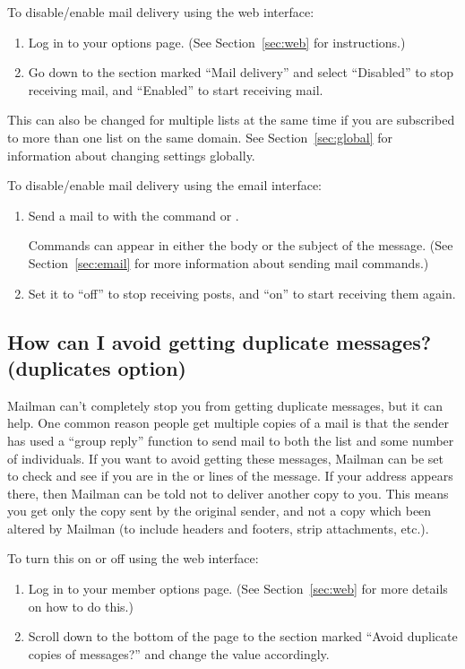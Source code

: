 \documentclass{howto}
\begin{document}
To disable/enable mail delivery using the web interface:
\begin{enumerate}
	\item Log in to your options page. (See Section~\ref{sec:web} for instructions.)
	\item Go down to the section marked ``Mail delivery'' and select ``Disabled''
		to stop receiving mail, and ``Enabled'' to start receiving mail.
\end{enumerate}

This can also be changed for multiple lists at the same time if you are subscribed to 
more than one list on the same domain.  See Section~\ref{sec:global} for 
information about changing settings globally.

To disable/enable mail delivery using the email interface:
\begin{enumerate}
   \item Send a mail to  with the command
    or .

   Commands can appear
   in either the body or the subject of the message.  (See
   Section~\ref{sec:email} for more information about sending mail
   commands.) 
	\item Set it to ``off'' to stop receiving posts, and ``on'' to start
	receiving them again.
\end{enumerate}

\subsection{How can I avoid getting duplicate messages? (duplicates option)
\label{sec:nodupes}}

Mailman can't completely stop you from getting duplicate messages, but it 
can help.  One common reason people get multiple copies of a mail is that 
the sender has used a ``group reply'' function to send mail to both the list
and some number of individuals.  If you want to avoid getting these messages,
Mailman can be set to check and see if you are in the  or
 lines of the message.  If your address appears there, then
Mailman can be told not to deliver another copy to you.  This means you get
only the copy sent by the original sender, and not a copy which been altered by
Mailman (to include headers and footers, strip attachments, etc.).

To turn this on or off using the web interface:
\begin{enumerate}
	\item Log in to your member options page.  (See Section~\ref{sec:web} 
	for more details on how to do this.)
	\item Scroll down to the bottom of the page to the section marked
	``Avoid duplicate copies of messages?'' and change the value accordingly.
\end{enumerate}
\end{document}
